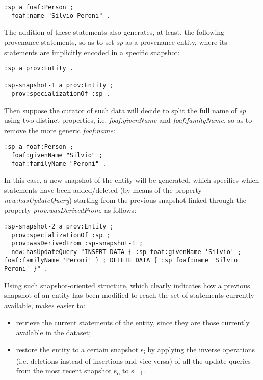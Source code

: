 \documentclass[runningheads,a4paper]{llncs}
\begin{document}
\begin{lstlisting}[mathescape]
:sp a foaf:Person ; 
  foaf:name "Silvio Peroni" .
\end{lstlisting}

The addition of these statements also generates, at least, the following provenance statements, so as to set {\em sp} as a provenance entity, where its statements are implicitly encoded in a specific snapshot:

\begin{lstlisting}[mathescape]
:sp a prov:Entity .

:sp-snapshot-1 a prov:Entity ;
  prov:specializationOf :sp .
\end{lstlisting}

Then suppose the curator of such data will decide to split the full name of {\em sp} using two distinct properties, i.e. {\em foaf:givenName} and {\em foaf:familyName}, so as to remove the more generic {\em foaf:name}:

\begin{lstlisting}[mathescape]
:sp a foaf:Person ;
  foaf:givenName "Silvio" ;
  foaf:familyName "Peroni" .
\end{lstlisting}

In this case, a new snapshot of the entity will be generated, which specifies which statements have been added/deleted (by means of the property {\em new:hasUpdateQuery}) starting from the previous snapshot linked through the property {\em prov:wasDerivedFrom}, as follows:

\begin{lstlisting}[mathescape]
:sp-snapshot-2 a prov:Entity ;
  prov:specializationOf :sp ;
  prov:wasDerivedFrom :sp-snapshot-1 ;
  new:hasUpdateQuery "INSERT DATA { :sp foaf:givenName 'Silvio' ; foaf:familyName 'Peroni' } ; DELETE DATA { :sp foaf:name 'Silvio Peroni' }" .
\end{lstlisting}

Using such snapshot-oriented structure, which clearly indicates how a previous snapshot of an entity has been modified to reach the set of statements currently available, makes easier to:
\begin{itemize}
\item retrieve the current statements of the entity, since they are those currently available in the dataset;
\item restore the entity to a certain snapshot s\textsubscript{i} by applying the inverse operations (i.e. deletions instead of insertions and vice versa) of all the update queries from the most recent snapshot s\textsubscript{n} to s\textsubscript{i+1}.
\end{itemize}
\end{document}

